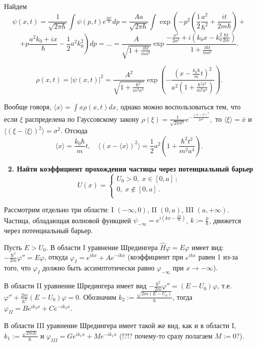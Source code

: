 \documentclass[a4paper,12pt]{article}
\begin{document}
Найдем
$$\psi(x,t)=\frac1{\sqrt{2\pi\hbar}}\int\psi(p,t)e^{\frac{ipx}\hbar}dp=
  \frac{Aa}{\sqrt{2\pi\hbar}}\int\exp\left(
    -p^2\left(\frac12\frac{a^2}{\hbar^2}+\frac{it}{2m\hbar}\right)+\right.$$
$$\left.+p\frac{a^2k_0+ix}\hbar-\frac12a^2k_0^2\right)dp=
\ldots=\frac A{\sqrt{1+\frac{i\hbar t}{ma^2}}}\exp\frac
  {-\frac{x^2}{2a^2}+i\left(k_0x-k_0^2\frac{\hbar t}{2m}\right)}
  {1+\frac{i\hbar t}{ma^2}}.$$

$$\rho(x,t)=|\psi(x,t)|^2=\frac{A^2}{\sqrt{1+\frac{\hbar^2}{m^2a^4}}}
  \exp\left(-\frac{\left(x-\frac{k_0\hbar}{m}t\right)^2}
  {a^2\left(1+\frac{\hbar^2t^2}{m^2a^4}\right)}\right).$$

Вообще говоря, $\langle x\rangle=\int x\rho(x,t)dx$,
однако можно воспользоваться тем, что если $\xi$ распределена по
Гауссовскому закону
%
$\rho(\xi)=\frac1{\sqrt{2\pi\sigma^2}}e^{-\frac{(x-\bar x)^2}{2\sigma^2}},$
%
то $\langle\xi\rangle=\bar x$ и
$\langle(\xi-\langle\xi\rangle)^2\rangle=\sigma^2$. Отсюда
%
$$\langle x\rangle=\frac{k_0\hbar}mt,\quad
  \langle(x-\langle x\rangle)^2\rangle=\frac12a^2\left(
    1+\frac{\hbar^2t^2}{m^2a^4}\right).$$

\noindent\textbf{~2. Найти коэффициент прохождения частицы через
потенциальный барьер
\[
U\left( x \right) = \left\{ {\begin{array}{l}
 U_0 > 0,\;x \in \left[ {0,a} \right]\,; \\
 0,\;x \notin \left[ {0,a} \right]\,. \\
 \end{array}} \right.
\]}

Рассмотрим отдельно три области:
   I $(-\infty,0)$, II $(0,a)$, III $(a,+\infty)$.
Частица, обладающая волновой функцией
   $\psi_{-\infty}=e^{i\left(kx-\frac{Et}\hbar\right)}$, $k:=\frac p\hbar$,
движется через потенциальный барьер.

Пусть $E>U_0$. В области I уравнение Шредингера $\hat H\varphi=E\varphi$
имеет вид: $-\frac{\hbar^2}{2m}\varphi''=E\varphi$, откуда
$\varphi_I=e^{ikx}+Ae^{-ikx}$ (коэффициент при $e^{ikx}$ равен 1 из-за
того, что $\varphi_I$ должно быть ассимптотически равно $\varphi_{-\infty}$
при $x\to-\infty$).

В области II уравнение Шредингера имеет вид
$-\frac{\hbar^2}{2m}\varphi''=(E-U_0)\varphi$, т.е.
$\varphi''+\frac{2m}{\hbar^2}(E-U_0)\varphi=0$. Обозначим
$k_2:=\frac{\sqrt{2m(E-U_0)}}\hbar$, тогда
$\varphi_{II}=Be^{ik_2x}+Ce^{-ik_2x}$.

В области III уравнение Шредингера имеет такой же вид, как и в области I,
$k_1:=\frac{\sqrt{2mE}}{\hbar}$ и $\varphi_{III}=Ge^{ik_1x}+Me^{-ik_1x}$ (!?!?
почему-то сразу полагаем $M:=0$?).
\end{document}
